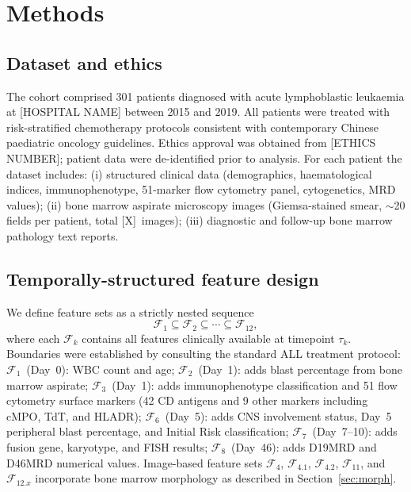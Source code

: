 \documentclass[pdflatex,sn-nature]{sn-jnl}
\begin{document}
\section{Methods}\label{sec:methods}

\subsection{Dataset and ethics}\label{sec:dataset}

The cohort comprised 301 patients diagnosed with acute lymphoblastic
leukaemia at [HOSPITAL NAME] between 2015 and 2019.
All patients were treated with risk-stratified chemotherapy protocols
consistent with contemporary Chinese paediatric oncology
guidelines.
Ethics approval was obtained from [ETHICS NUMBER]; patient data were
de-identified prior to analysis.
For each patient the dataset includes:
(i) structured clinical data (demographics, haematological indices,
immunophenotype, 51-marker flow cytometry panel, cytogenetics,
MRD values);
(ii) bone marrow aspirate microscopy images (Giemsa-stained smear,
$\sim$20 fields per patient, total [X]~images);
(iii) diagnostic and follow-up bone marrow pathology text reports.

\subsection{Temporally-structured feature design}\label{sec:features}

We define feature sets as a strictly nested sequence
\begin{equation}
\mathcal{F}_1 \subseteq \mathcal{F}_2 \subseteq \cdots \subseteq
\mathcal{F}_{12},
\label{eq:featseq}
\end{equation}
where each $\mathcal{F}_k$ contains all features clinically available
at timepoint $\tau_k$.
Boundaries were established by consulting the standard ALL treatment
protocol: $\mathcal{F}_1$~(Day~0): WBC count and age;
$\mathcal{F}_2$~(Day~1): adds blast percentage from bone marrow
aspirate; $\mathcal{F}_3$~(Day~1): adds immunophenotype classification
and 51 flow cytometry surface markers (42 CD antigens and 9 other
markers including cMPO, TdT, and HLADR); $\mathcal{F}_6$~(Day~5):
adds CNS involvement status, Day~5 peripheral blast percentage, and
Initial Risk classification; $\mathcal{F}_7$~(Day~7--10): adds fusion
gene, karyotype, and FISH results; $\mathcal{F}_8$~(Day~46): adds
D19MRD and D46MRD numerical values.
Image-based feature sets $\mathcal{F}_{4}$, $\mathcal{F}_{4.1}$,
$\mathcal{F}_{4.2}$, $\mathcal{F}_{11}$, and $\mathcal{F}_{12.x}$
incorporate bone marrow morphology as described in
Section~\ref{sec:morph}.
\end{document}
